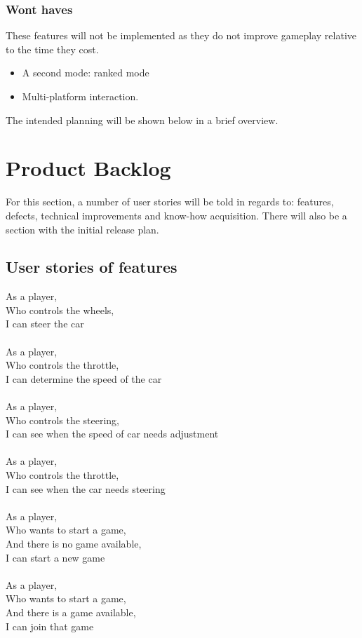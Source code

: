 \documentclass{article}
\begin{document}
\subsubsection{Wont haves}
These features will not be implemented as they do not improve gameplay relative to the time they cost.
\begin{itemize}
    \item A second mode: ranked mode
    \item Multi-platform interaction.
\end{itemize}
The intended planning will be shown below in a brief overview.
\section{Product Backlog}
For this section, a number of user stories will be told in regards to: features, defects,  technical improvements and know-how acquisition. There will also be a section with the initial release plan.
\subsection{User stories of features}
As a player,\\
Who controls the wheels,\\
I can steer the car\\
\\
As a player,\\
Who controls the throttle,\\
I can determine the speed of the car\\
\\
As a player,\\
Who controls the steering,\\
I can see when the speed of car needs adjustment\\
\\
As a player,\\
Who controls the throttle,\\
I can see when the car needs steering\\
\\
As a player,\\
Who wants to start a game,\\
And there is no game available,\\
I can start a new game\\
\\
As a player,\\
Who wants to start a game,\\
And there is a game available,\\
I can join that game\\
\end{document}
